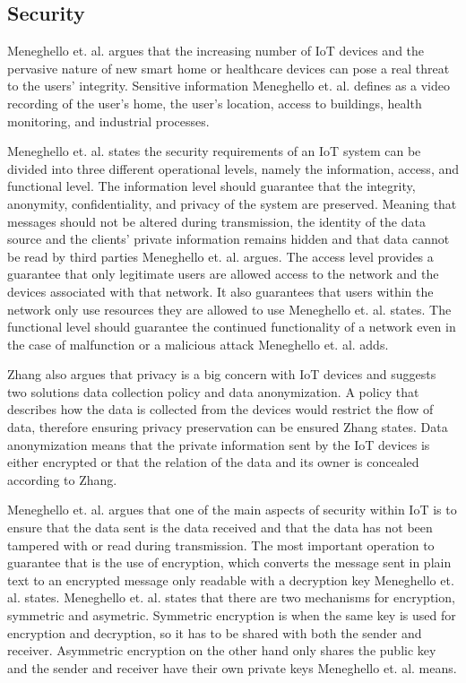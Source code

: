 \subsection{Security}
Meneghello et. al. argues that the increasing number of IoT devices and the pervasive nature of new smart home or healthcare devices can pose a real threat to the users' integrity.
Sensitive information Meneghello et. al. defines as a video recording of the user's home, the user's location, access to buildings, health monitoring, and industrial processes.\cite{Meneghello2019}

Meneghello et. al. states the security requirements of an IoT system can be divided into three different operational levels, namely the information, access, and functional level.\cite{Meneghello2019}
The information level should guarantee that the integrity, anonymity, confidentiality, and privacy of the system are preserved. 
Meaning that messages should not be altered during transmission, the identity of the data source and the clients' private information remains hidden and that data cannot be read by third parties Meneghello et. al. argues.\cite{Meneghello2019} 
The access level provides a guarantee that only legitimate users are allowed access to the network and the devices associated with that network. 
It also guarantees that users within the network only use resources they are allowed to use Meneghello et. al. states.\cite{Meneghello2019}
The functional level should guarantee the continued functionality of a network even in the case of malfunction or a malicious attack Meneghello et. al. adds.\cite{Meneghello2019}

Zhang also argues that privacy is a big concern with IoT devices and suggests two solutions data collection policy and data anonymization.\cite{Zhang2014}
A policy that describes how the data is collected from the devices would restrict the flow of data, therefore ensuring privacy preservation can be ensured Zhang states.\cite{Zhang2014}
Data anonymization means that the private information sent by the IoT devices is either encrypted or that the relation of the data and its owner is concealed according to Zhang.\cite{Zhang2014}

Meneghello et. al. argues that one of the main aspects of security within IoT is to ensure that the data sent is the data received and that the data has not been tampered with or read during transmission.
The most important operation to guarantee that is the use of encryption, which converts the message sent in plain text to an encrypted message only readable with a decryption key Meneghello et. al. states.\cite{Meneghello2019}
Meneghello et. al. states that there are two mechanisms for encryption, symmetric and asymetric.\cite{Meneghello2019} 
Symmetric encryption is when the same key is used for encryption and decryption, so it has to be shared with both the sender and receiver.
Asymmetric encryption on the other hand only shares the public key and the sender and receiver have their own private keys Meneghello et. al. means.\cite{Meneghello2019}

